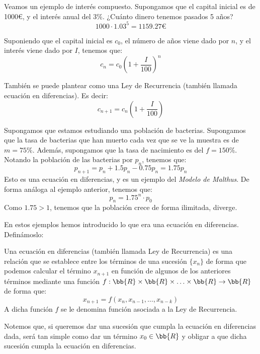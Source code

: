 \begin{ejemplo}
    Veamos un ejemplo de interés compuesto. Supongamos que el capital inicial es de 1000€, y el interés anual del 3\%. ¿Cuánto dinero tenemos pasados 5 años?
    \begin{equation*}
        1000\cdot 1.03^5 = 1159.27\text{€}
    \end{equation*}

    Suponiendo que el capital inicial es $c_0$, el número de años viene dado por $n$, y el interés viene dado por $I$, tenemos que:
    \begin{equation*}
        c_n = c_0\left(1+\dfrac{I}{100}\right)^n
    \end{equation*}

    También se puede plantear como una Ley de Recurrencia (también llamada ecuación en diferencias). Es decir:
    \begin{equation*}
        c_{n+1} = c_n\left(1+\dfrac{I}{100}\right)
    \end{equation*}
\end{ejemplo}


\begin{ejemplo}
    Supongamos que estamos estudiando una población de bacterias. Supongamos que la tasa de bacterias que han muerto cada vez que se ve la muestra es de $m=75\%$. Además, supongamos que la tasa de nacimiento es del $f=150\%$. Notando la población de las bacterias por $p_n$, tenemos que:
    \begin{equation*}
        p_{n+1} = p_n + 1.5p_n - 0.75p_n
        = 1.75p_n
    \end{equation*}
    Esto es una ecuación en diferencias, y es un ejemplo del \emph{Modelo de Malthus}. De forma análoga al ejemplo anterior, tenemos que:
    \begin{equation*}
        p_n = 1.75^n\cdot p_0 
    \end{equation*}
    Como $1.75>1$, tenemos que la población crece de forma ilimitada, diverge.
\end{ejemplo}

En estos ejemplos hemos introducido lo que era una ecuación en diferencias. Definámoslo:
\begin{definicion}
    Una ecuación en diferencias (también llamada Ley de Recurrencia) es una relación que se establece entre los términos de una sucesión $\{x_n\}$ de forma que podemos calcular el término $x_{n+1}$ en función de algunos de los anteriores términos mediante una función $f:\bb{R}\times \bb{R}\times \ldots \times \bb{R} \to \bb{R}$ de forma que:
    \begin{equation*}
        x_{n+1} = f(x_n, x_{n-1}, \ldots, x_{n-k})
    \end{equation*}
    A dicha función $f$ se le denomina función asociada a la Ley de Recurrencia.
\end{definicion}
Notemos que, si queremos dar una sucesión que cumpla la ecuación en diferencias dada, será tan simple como dar un término $x_0 \in \bb{R}$ y obligar a que dicha sucesión cumpla la ecuación en diferencias.

